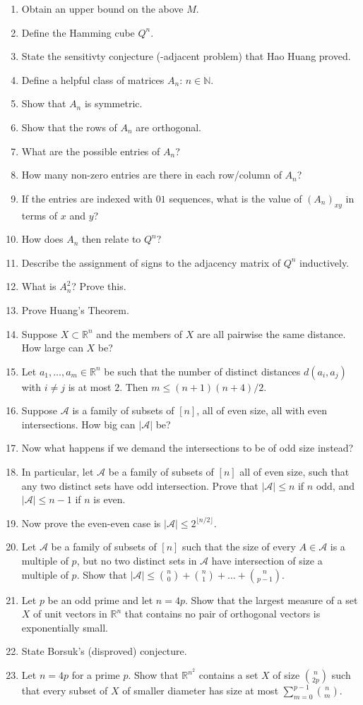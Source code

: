\documentclass[10pt]{article}
\newcommand{\mc}[1]{\mathcal{#1}}
\newcommand{\bb}[1]{\mathbb{#1}}
\newcommand{\R}{\bb{R}}
\newcommand{\N}{\mathbb{N}}
\begin{document}
\begin{enumerate}
    \item Obtain an upper bound on the above $M$.
    \item Define the Hamming cube $Q^n$.
    \item State the sensitivty conjecture (-adjacent problem) that Hao Huang proved.
    \item Define a helpful class of matrices $A_n$: $n\in\N$.
    \item Show that $A_n$ is symmetric.
    \item Show that the rows of $A_n$ are orthogonal.
    \item What are the possible entries of $A_n$?
    \item How many non-zero entries are there in each row/column of $A_n$?
    \item If the entries are indexed with $01$ sequences, what is the value of $(A_n)_{xy}$ in terms of $x$ and $y$?
    \item How does $A_n$ then relate to $Q^n$?
    \item Describe the assignment of signs to the adjacency matrix of $Q^n$ inductively.
    \item What is $A_n^2$? Prove this.
    \item Prove Huang's Theorem.
    \item Suppose $X\subset \R^n$ and the members of $X$ are all pairwise the same distance. How large can $X$ be?
    \item Let $a_1,\dots,a_m \in \R^n$ be such that the number of distinct distances $d(a_i,a_j)$ with $i\ne j$ is at most $2$. Then $m \le (n+1)(n+4)/2$.
    \item Suppose $\mc{A}$ is a family of subsets of $[n]$, all of even size, all with even intersections. How big can $|\mc{A}|$ be?
    \item Now what happens if we demand the intersections to be of odd size instead?
    \item In particular, let $\mc{A}$ be a family of subsets of $[n]$ all of even size, such that any two distinct sets have odd intersection. Prove that $|\mc{A}| \le n$ if $n$ odd, and $|\mc{A}| \le n-1$ if $n$ is even.
    \item Now prove the even-even case is $|\mc{A}| \le 2^{\lfloor n/2\rfloor}$.
    \item Let $\mc{A}$ be a family of subsets of $[n]$ such that the size of every $A \in \mc{A}$ is a multiple of $p$, but no two distinct sets in $\mc{A}$ have intersection of size a multiple of $p$. Show that $|\mc{A}| \le {n\choose 0} + {n\choose 1} + \dots + {n\choose p-1}$.
    \item Let $p$ be an odd prime and let $n = 4p$. Show that the largest measure of a set $X$ of unit vectors in $\R^{n}$ that contains no pair of orthogonal vectors is exponentially small.
    \item State Borsuk's (disproved) conjecture.
    \item Let $n = 4p$ for a prime $p$. Show that $\R^{n^2}$ contains a set $X$ of size ${n\choose 2p}$ such that every subset of $X$ of smaller diameter has size at most $\sum_{m=0}^{p-1}{n\choose m}$.
\end{enumerate}
\end{document}
